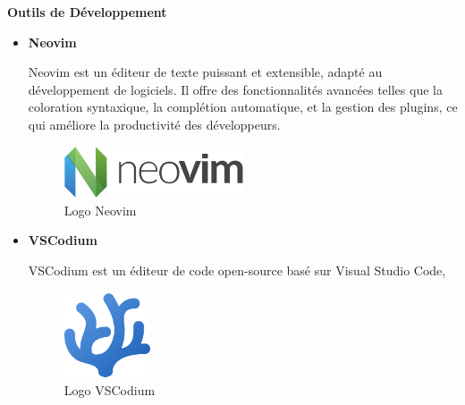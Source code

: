 \textbf{Outils de Développement}
\begin{itemize}
  \item \textbf{Neovim}

    Neovim est un éditeur de texte puissant et extensible, adapté au
    développement de logiciels. Il offre des fonctionnalités avancées telles
    que la coloration syntaxique, la complétion automatique, et la gestion
    des plugins, ce qui améliore la productivité des développeurs.

    \begin{figure}[H]
      \centering
      \includegraphics[width=0.5\textwidth]{images/Neovim-logo.png}
      \caption{Logo Neovim}
    \end{figure}

  \item \textbf{VSCodium}

    VSCodium est un éditeur de code open-source basé sur Visual Studio Code,
    \begin{figure}[H]
      \centering
      \includegraphics[width=1.0in, height=1.0in]{images/codium_cnl.png}
      \caption{Logo VSCodium}
    \end{figure}
\end{itemize}

